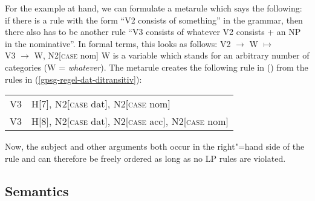 For the example at hand, we can formulate a metarule which says the following: if there is a rule with the form ``V2 consists of something'' in the grammar,
then there also has to be another rule ``V3 consists of whatever V2 consists + an NP in the nominative''. In formal terms, this looks as follows:
\ea
\label{subjekt-meta}
V2  $\to$ W $\mapsto$\\
V3  $\to$ W, N2[\textsc{case} nom]
\z
W is a variable which stands for an arbitrary number of categories (W = \emph{what\-ever}). The metarule creates the following rule in () from the rules
in (\ref{gpsg-regel-dat-ditransitiv}):
\ea
\begin{tabular}[t]{@{}l@{~$\to$~}l@{}}
V3  & H[7], N2[\textsc{case} dat], N2[\textsc{case} nom]                \\
V3  & H[8], N2[\textsc{case} dat], N2[\textsc{case} acc], N2[\textsc{case} nom]  \\
\end{tabular}
\z

\noindent
Now, the subject and other arguments both occur in the right"=hand side of the rule and can therefore be freely ordered as long as no LP rules are violated.%


\subsection{Semantics}
\label{Sec-GPSG-Sem}

